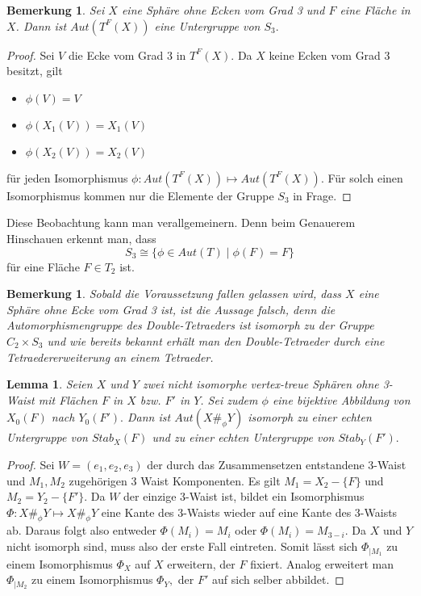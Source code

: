 \documentclass[12pt,titlepage,twoside,cleardoublepage]{article}
\theoremstyle{nummermitklammern}
\newtheorem{lemma}[temp]{Lemma}
\newtheorem{bemerkung}[temp]{Bemerkung}
\newtheorem{lemma}[zahl]{Lemma}
\newtheorem{bemerkung}[zahl]{Bemerkung}
\numberwithin{equation}{section}
\begin{document}
\begin{bemerkung}
Sei $X$ eine Sphäre ohne Ecken vom Grad 3 und $F$ eine Fläche in $X$. Dann ist $Aut(T^F(X))$ eine Untergruppe von $S_3.$ 
\end{bemerkung}
\begin{proof}
Sei $V$ die Ecke vom Grad 3 in $T^F(X).$
Da $X$ keine Ecken vom Grad 3 besitzt, gilt
\begin{itemize}
\item $\phi(V)=V$
\item $\phi (X_1(V))=X_1(V)$
\item $\phi (X_2(V))=X_2(V)$
\end{itemize}
für jeden Isomorphismus $\phi:Aut({T}^F(X))\mapsto Aut({T}^F(X)).$ Für solch einen Isomorphismus kommen nur die Elemente der Gruppe $S_3$ in Frage. 
\end{proof}
Diese Beobachtung kann man verallgemeinern. Denn beim Genauerem Hinschauen erkennt man, dass 
\[
S_3\cong\{\phi\in Aut(T)\mid \phi(F)=F\}
\] für eine Fläche $F\in T_2$ ist.
\begin{bemerkung}
Sobald die Voraussetzung fallen gelassen wird, dass $X$ eine Sphäre ohne Ecke vom Grad 3 ist, ist die Aussage falsch, denn die Automorphismengruppe des Double-Tetraeders ist isomorph zu der Gruppe $C_2\times S_3$ und wie bereits bekannt erhält man den Double-Tetraeder durch eine Tetraedererweiterung an einem Tetraeder.
\end{bemerkung}
\begin{lemma}
Seien $X$ und $Y$ zwei nicht isomorphe vertex-treue Sphären ohne 3-Waist mit Flächen $F$ in $X$ bzw. $F'$ in $Y$. Sei zudem $\phi$ eine bijektive Abbildung von $X_0(F)$ nach $Y_0(F').$ Dann ist $Aut(X\#_\phi Y)$ isomorph zu einer echten Untergruppe von $Stab_X(F)$ und zu einer echten Untergruppe von $Stab_Y(F').$
\end{lemma}
\begin{proof}
Sei $W=(e_1,e_2,e_3)$ der durch das Zusammensetzen entstandene 3-Waist und $M_1,M_2$ zugehörigen 3 Waist Komponenten. Es gilt $M_1=X_2-\{F\}$ und $M_2=Y_2-\{F'\}.$ Da $W$ der einzige 3-Waist ist, bildet ein Isomorphismus $\Phi:X\#_{\phi}Y \mapsto X\#_{\phi}Y$  eine Kante des 3-Waists wieder auf eine Kante des 3-Waists ab. Daraus folgt also entweder $\Phi(M_i)=M_i$ oder $\Phi(M_i)=M_{3-i}.$ Da $X$ und $Y$ nicht isomorph sind, muss also der erste Fall eintreten. Somit lässt sich \textsc{$\Phi_{\mid M_1}$} zu einem Isomorphismus $\Phi_X$ auf $X$ erweitern, der $F$ fixiert. Analog erweitert man $\Phi_{\mid M_2}$ zu einem Isomorphismus $\Phi_Y,$ der $F'$ auf sich selber abbildet.
\end{proof}
\end{document}
